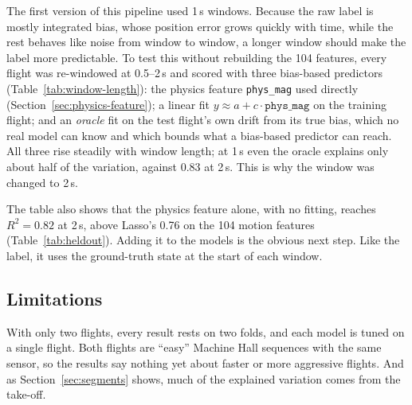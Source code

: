 The first version of this pipeline used 1\,s windows. Because the raw label is
mostly integrated bias, whose position error grows quickly with time, while the
rest behaves like noise from window to window, a longer window should make the
label more predictable. To test this without rebuilding the 104 features, every
flight was re-windowed at 0.5--2\,s and scored with three bias-based
predictors (Table~\ref{tab:window-length}): the physics feature
\texttt{phys\_mag} used directly (Section~\ref{sec:physics-feature}); a linear
fit $y \approx a + c \cdot \texttt{phys\_mag}$ on the training flight; and an
\emph{oracle} fit on the test flight's own drift from its true bias, which no
real model can know and which bounds what a bias-based predictor can reach.
All three rise steadily with window length; at 1\,s even the oracle explains
only about half of the variation, against 0.83 at 2\,s. This is why the window
was changed to 2\,s.

The table also shows that the physics feature alone, with no fitting, reaches
$R^2 = 0.82$ at 2\,s, above Lasso's 0.76 on the 104 motion features
(Table~\ref{tab:heldout}). Adding it to the models is the obvious next step.
Like the label, it uses the ground-truth state at the start of each window.

\subsection{Limitations}

With only two flights, every result rests on two folds, and each model is tuned
on a single flight. Both flights are ``easy'' Machine Hall sequences with the
same sensor, so the results say nothing yet about faster or more aggressive
flights. And as Section~\ref{sec:segments} shows, much of the explained
variation comes from the take-off.
